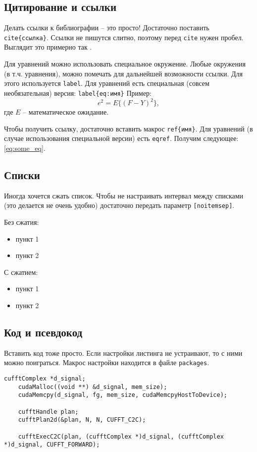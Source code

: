 \subsection{Цитирование и ссылки}
Делать ссылки к библиографии -- это просто! Достаточно поставить \texttt{\\cite\{ссылка\}}. Ссылки не пишутся слитно, поэтому перед \texttt{cite} нужен пробел. Выглядит это примерно так \cite{test}.

Для уравнений можно использовать специальное окружение. Любые окружения (в т.ч. уравнения), можно помечать для дальнейшей возможности ссылки. Для этого используется \texttt{label}. Для уравнений есть специальная (совсем необязательная) версия: \texttt{label\{eq:имя\}} Пример:
\begin{equation}\label{eq:some_eq}
	e^2 = E\{(F - Y)^2\},
\end{equation}
где $E$ -- математическое ожидание.

Чтобы получить ссылку, достаточно вставить макрос \texttt{ref\{имя\}}. Для уравнений (в случае использования специальной версии) есть \texttt{eqref}. Получим следующее: \eqref{eq:some_eq}.

\subsection{Списки}
Иногда хочется сжать список. Чтобы не настраивать интервал между списками (это делается не очень удобно) достаточно передать параметр \texttt{[noitemsep]}.

Без сжатия:
\begin{itemize}
    \item пункт 1
    \item пункт 2
\end{itemize}

С сжатием:
\begin{itemize}[noitemsep]
    \item пункт 1
    \item пункт 2
\end{itemize}

\subsection{Код и псевдокод}
Вставить код тоже просто. Если настройки листинга не устраивают, то с ними можно поиграться. Макрос настройки находится в файле \texttt{packages}.

\begin{lstlisting}[caption={Пример вызова БПФ в библиотеке \texttt{CuFFT}}]
	cufftComplex *d_signal;
	cudaMalloc((void **) &d_signal, mem_size); 
	cudaMemcpy(d_signal, fg, mem_size, cudaMemcpyHostToDevice);
	
	cufftHandle plan;
	cufftPlan2d(&plan, N, N, CUFFT_C2C);
	
	cufftExecC2C(plan, (cufftComplex *)d_signal, (cufftComplex *)d_signal, CUFFT_FORWARD);
\end{lstlisting}

